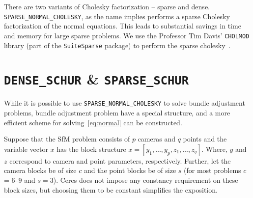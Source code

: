 There are two variants of Cholesky factorization -- sparse and dense. \texttt{SPARSE\_NORMAL\_CHOLESKY}, as the name implies performs a sparse Cholesky factorization of the normal equations. This leads to substantial savings in time and memory for large sparse problems. We use the Professor Tim Davis' \texttt{CHOLMOD} library (part of the \texttt{SuiteSparse} package) to perform the sparse cholesky~\cite{chen2006acs}.

\section{\texttt{DENSE\_SCHUR} \& \texttt{SPARSE\_SCHUR}}
While it is possible to use \texttt{SPARSE\_NORMAL\_CHOLESKY} to solve bundle adjustment problems, bundle adjustment problem have a special structure, and a more efficient scheme for solving~\eqref{eq:normal} can be constructed.

Suppose that the SfM problem consists of $p$ cameras and $q$ points and the variable vector $x$ has the  block structure $x = [y_{1},\hdots,y_{p},z_{1},\hdots,z_{q}]$. Where, $y$ and $z$ correspond to camera and point parameters, respectively.  Further, let the camera blocks be of size $c$ and the point blocks be of size $s$ (for most problems $c$ =  $6$--$9$ and $s = 3$). Ceres does not impose any constancy requirement on these block sizes, but choosing them to be constant simplifies the exposition.


